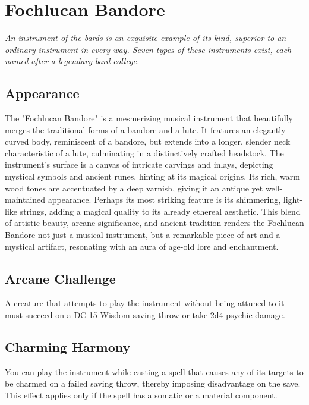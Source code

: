 \ItemSubCategory{}

\chapter*{Fochlucan Bandore}

\textit{An instrument of the bards is an exquisite example of its kind, superior to an ordinary instrument in every way. Seven types of these instruments exist, each named after a legendary bard college.}

\section*{Appearance}
The "Fochlucan Bandore" is a mesmerizing musical instrument that beautifully merges the traditional forms of a bandore and a lute. It features an elegantly curved body, reminiscent of a bandore, but extends into a longer, slender neck characteristic of a lute, culminating in a distinctively crafted headstock. The instrument's surface is a canvas of intricate carvings and inlays, depicting mystical symbols and ancient runes, hinting at its magical origins. Its rich, warm wood tones are accentuated by a deep varnish, giving it an antique yet well-maintained appearance. Perhaps its most striking feature is its shimmering, light-like strings, adding a magical quality to its already ethereal aesthetic. This blend of artistic beauty, arcane significance, and ancient tradition renders the Fochlucan Bandore not just a musical instrument, but a remarkable piece of art and a mystical artifact, resonating with an aura of age-old lore and enchantment.

\section*{Arcane Challenge}
A creature that attempts to play the instrument without being attuned to it must succeed on a DC 15 Wisdom saving throw or take 2d4 psychic damage.

\section*{Charming Harmony}
You can play the instrument while casting a spell that causes any of its targets to be charmed on a failed saving throw, thereby imposing disadvantage on the save. This effect applies only if the spell has a somatic or a material component.


